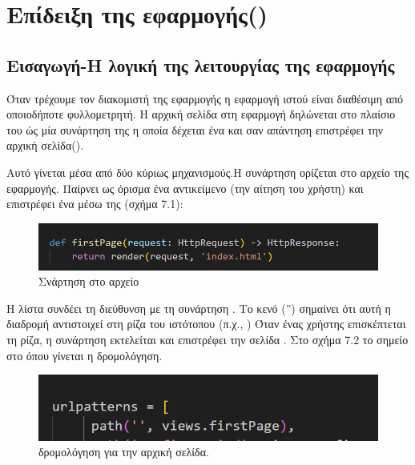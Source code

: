 \chapter{Επίδειξη της εφαρμογής()}

\section{Εισαγωγή-Η λογική της λειτουργίας της εφαρμογής }

Όταν τρέχουμε τον διακομιστή της εφαρμογής η εφαρμογή ιστού
είναι διαθέσιμη από οποιοδήποτε φυλλομετρητή. Η αρχική σελίδα στη εφαρμογή
 δηλώνεται στο πλαίσιο του  ώς μία συνάρτηση της 
η οποία δέχεται ένα  και σαν απάντηση επιστρέφει την αρχική σελίδα().

Αυτό γίνεται μέσα από δύο κύριως μηχανισμούς.Η συνάρτηση  ορίζεται στο αρχείο  της εφαρμογής. Παίρνει ως όρισμα ένα αντικείμενο  
(την αίτηση του χρήστη) και επιστρέφει ένα  μέσω της (σχήμα 7.1):

\FloatBarrier
\begin{figure}[h]
	\centering
	\includegraphics[width=1.0\textwidth]{graphics/firstPage.png}
	\caption{Σνάρτηση  στο αρχείο  }
\end{figure}

\FloatBarrier

Η λίστα  συνδέει τη διεύθυνση  
με τη συνάρτηση . Το κενό  ('') σημαίνει ότι αυτή η διαδρομή αντιστοιχεί στη ρίζα του ιστότοπου (π.χ., )
Όταν ένας χρήστης επισκέπτεται τη ρίζα, η συνάρτηση  
εκτελείται και επιστρέφει την  σελίδα . Στο σχήμα 7.2 το σημείο στο  όπου γίνεται η δρομολόγηση.

\FloatBarrier

\begin{figure}[h]
	\centering
	\includegraphics[width=1.0\textwidth]{graphics/urls_firstPage.png}
	\caption{  δρομολόγηση για την αρχική σελίδα.}
\end{figure}

